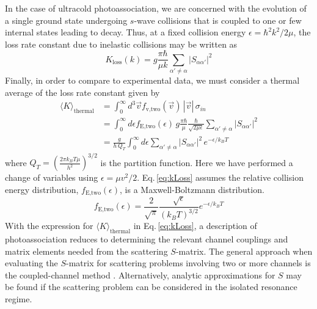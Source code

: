 In the case of ultracold photoassociation, we are concerned with the evolution of a single ground state undergoing $s$-wave collisions that is coupled to one or few internal states leading to decay.
Thus, at a fixed collision energy $\epsilon = \hbar^2 k^2 / 2\mu$, the loss rate constant due to inelastic collisions may be written as 
\begin{equation}
	K_{\text{loss}}(k) = g \frac{\pi \hbar}{\mu k} \sum_{\alpha' \neq \alpha}\vert S_{\alpha \alpha'} \vert^2
\end{equation}
Finally, in order to compare to experimental data, we must consider a thermal average of the loss rate constant given by \cite{Julienne2009, Julienne2009a, Krems2009a}
\begin{align} \label{eq:kLoss}
\nonumber
  \langle K \rangle_\text{thermal} &= \int_0^{\infty} d^3\vec{v} f_\text{v,two}(\vec{v})\,|\vec{v}|\,\sigma_{in} \\
  \nonumber
                                  &= \int_0^{\infty} d\epsilon  f_\text{E,two}(\epsilon)\, g \frac{\pi \hbar}{\mu} \frac{\hbar}{\sqrt{2 \mu \epsilon}} \sum_{\alpha' \neq \alpha}\vert S_{\alpha \alpha'} \vert^2 \\
                                  &= \frac{g}{h\,Q_{T}} \int_{0}^{\infty} d\epsilon \sum_{\alpha' \neq \alpha}\vert S_{\alpha \alpha'} \vert^2 \,e^{-\epsilon/k_{B}T}
\end{align}
where $Q_T=\left( \frac{2 \pi k_B T \mu}{h^2} \right)^{3/2}$ is the partition function.
Here we have performed a change of variables using $\epsilon = \mu v^2/2$.
Eq.\,\ref{eq:kLoss} assumes the relative collision energy distribution, $f_\text{E,two}(\epsilon)$, is a Maxwell-Boltzmann distribution.
\begin{equation}
	f_\text{E,two}(\epsilon) = \frac{2}{\sqrt{\pi}} \frac{\sqrt{\epsilon}}{(k_B T)^{3/2}} e^{-\epsilon/k_B T}
\end{equation}
With the expression for $ \langle K \rangle_\text{thermal}$ in Eq.\,\ref{eq:kLoss}, a description of photoassociation reduces to determining the relevant channel couplings and matrix elements needed from the scattering $S$-matrix.
The general approach when evaluating the $S$-matrix for scattering problems involving two or more channels is the coupled-channel method \cite{Krems2009a}.
Alternatively, analytic approximations for $S$ may be found if the scattering problem can be considered in the isolated resonance regime.

